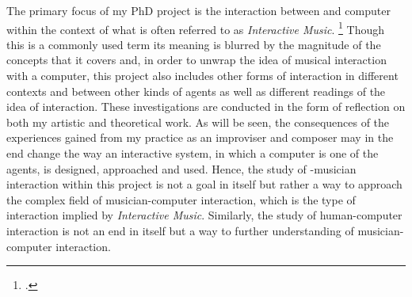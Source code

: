 The primary focus of my PhD project is the interaction between  and computer within the context of what is often referred to as \emph{Interactive Music}.
\footcite[See][]{wiki_interactive,Garnett,rowe,winkler01,rowe01} Though this is a commonly used term its meaning is blurred by the magnitude of the concepts that it covers and, in order to unwrap the idea of musical interaction with a computer, this project also includes other forms of interaction in different contexts and between other kinds of agents as well as different readings of the idea of interaction. These investigations are conducted in the form of reflection on both my artistic and theoretical work. As will be seen, the consequences of the experiences gained from my practice as an improviser and composer may in the end change the way an interactive system, in which a computer is one of the agents, is designed, approached and used. Hence, the study of -musician interaction within this project is not a goal in itself but rather a way to approach the complex field of musician-computer interaction, which is the type of interaction implied by \emph{Interactive Music}. Similarly, the study of human-computer interaction is not an end in itself but a way to further understanding of musician-computer interaction.



